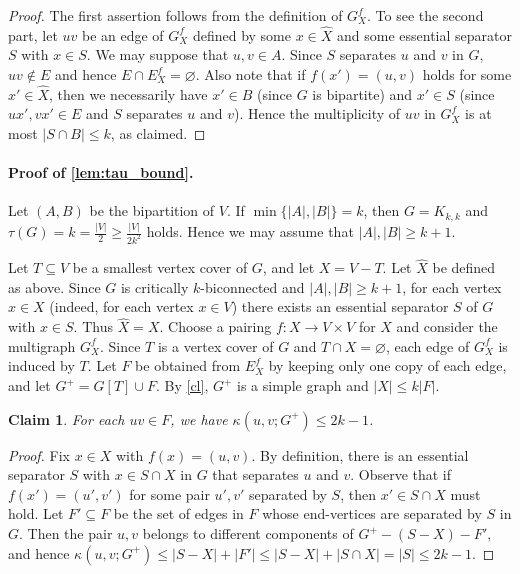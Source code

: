 \documentclass[11pt,a4paper,dvipsnames]{scrartcl}
\newtheorem{claim}[theorem]{Claim}
\begin{document}
\begin{proof}
    The first assertion follows from the definition of $G^f_X$.
    To see the second part, let $uv$ be an edge of $G^f_X$
    defined by some $x\in \hat X$ and some essential separator $S$ with $x\in S$.
    We may suppose that $u,v\in A$. Since $S$ separates $u$ and $v$ in $G$, $uv\not\in E$ and hence $E\cap E^f_X=\varnothing$.
    Also note that if $f(x') = (u,v)$ holds for some $x' \in \hat X$, then we necessarily have $x' \in B$ (since $G$ is bipartite) and $x' \in S$ (since $ux',vx' \in E$ and $S$ separates $u$ and $v$).
    Hence the multiplicity of $uv$ in $G^f_X$ is at most $|S\cap B|\leq k$, as claimed.
\end{proof}


\paragraph{Proof of \texorpdfstring{\cref{lem:tau_bound}}{Theorem 5.1}.}  \hspace{-1em}
Let $(A,B)$ be the bipartition of $V$. If $\min \{|A|,|B|\}=k$, then $G=K_{k,k}$ and $\tau(G)=k=\frac{|V|}{2}\geq \frac{|V|}{2k^2}$ holds. Hence we may assume that $|A|,|B|\geq k+1$.

Let $T\subseteq V$ be a smallest vertex cover of $G$, and let $X=V-T$. Let $\hat X$ be defined as above. Since $G$ is critically $k$-biconnected and $|A|,|B|\geq k+1$, for each vertex $x\in X$ (indeed, for each vertex $x \in V$) there exists an essential separator $S$ of $G$ with $x\in S$. Thus $\hat X=X$. Choose a pairing $f : X \to V \times V$ for $X$ and consider the multigraph $G^f_X$. Since $T$ is a vertex cover of $G$ and $T\cap X=\varnothing$, each edge of $G^f_X$ is induced by $T$. Let $F$ be obtained from $E^f_X$ by keeping only one copy of each edge, and let $G^+=G[T]\cup F$. By \cref{cl}, $G^+$ is a simple graph and $|X|\leq k|F|$.

\begin{claim}\label{cl2}
    For each $uv\in F$, we have $\kappa(u,v;G^+)\leq 2k-1$.
\end{claim}

\begin{proof}
    Fix $x \in X$ with $f(x)=(u,v)$. By definition, there is an essential separator $S$ with $x\in S\cap X$ in $G$ that separates $u$ and $v$. Observe that if $f(x')=(u',v')$ for some pair $u',v'$ separated by $S$, then $x'\in S\cap X$ must hold. Let $F'\subseteq F$ be the set of edges in $F$ whose end-vertices are separated by $S$ in $G$. Then the pair $u,v$ belongs to different components of $G^+-(S-X)-F'$, and hence $\kappa(u,v;G^+)\leq |S-X|+|F'|\leq |S-X|+|S\cap X|=|S|\leq 2k-1$.
\end{proof}
\end{document}
